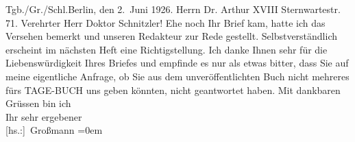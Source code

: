 \begin{ledgroupsized}[t]{13cm}
           \pstart
           \noindent{}Tgb./Gr./Schl.\hfill Berlin, den 2. Juni
                     1926.\pend
           {\bigskip}\pstart
           \noindent{}\raggedleft{}Herrn\pend
           \pstart
           \noindent{}\raggedleft{}Dr. Arthur \pend
           \pstart
           \noindent{}\raggedleft{} XVIII\pend
           \pstart
           \noindent{}\raggedleft{}Sternwartestr. 71.\pend
           \pstart{}Verehrter Herr Doktor Schnitzler!\pend\pstart
           Ehe noch Ihr Brief kam, hatte ich das Versehen bemerkt und unseren Redakteur zur Rede gestellt.
               Selbstverständlich erscheint im nächsten Heft eine Richtigstellung.\pend
           \pstart
           Ich danke Ihnen sehr für die Liebenswürdigkeit Ihres Briefes und empfinde es nur als
               etwas bitter, dass Sie auf meine eigentliche Anfrage, ob Sie aus dem
               unveröffentlichten Buch nicht
               mehreres fürs TAGE-BUCH uns geben könnten, nicht geantwortet haben.\pend
           \pstart
           Mit dankbaren Grüssen bin ich{\\[\baselineskip]}Ihr sehr ergebener{\\[\baselineskip]}\spacefill\mbox{{[}hs.:{]} Großmann}\pend
           \leftskip=0em{}
         
         \endnumbering{}\end{ledgroupsized}  \newcommand{\dateiname}{L02477}\newcommand{\titel}{Stefan Großmann an Arthur Schnitzler, 2. 6. 1926}\newcommand{\editorInnen}{ Martin Anton Müller und Gerd-Hermann Susen}
      